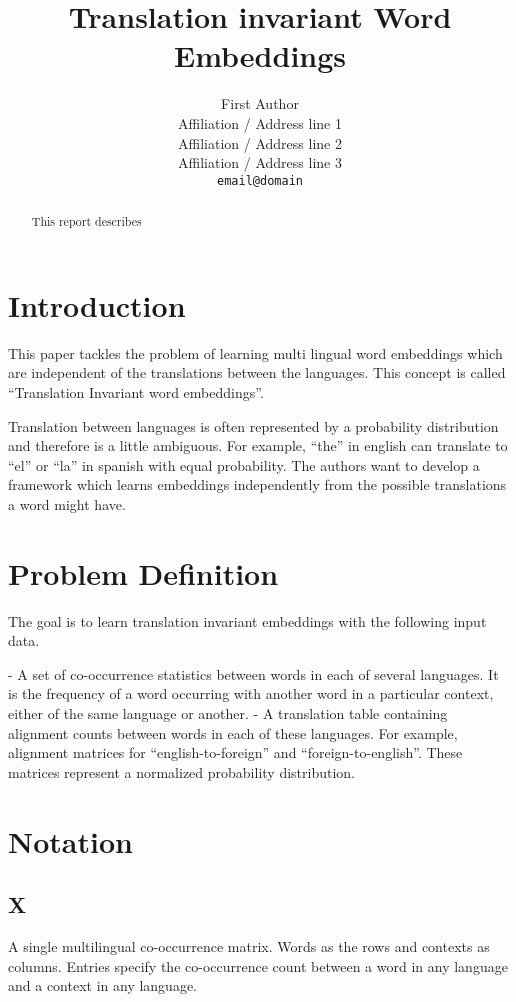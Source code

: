 \documentclass[11pt]{article}
\title{Translation invariant Word Embeddings}
\author{First Author \\
  Affiliation / Address line 1 \\
  Affiliation / Address line 2 \\
  Affiliation / Address line 3 \\
  {\tt email@domain}}
\date{}
\begin{document}
\maketitle
\begin{abstract}
This report describes \cite{huang2015translation}
\end{abstract}

\section{Introduction}
This paper tackles the problem of learning multi lingual word embeddings which are independent of the translations between the languages.  This concept is called “Translation Invariant word embeddings”.

Translation between languages is often represented by a probability distribution and therefore is a little ambiguous. For example, “the” in english can translate to “el” or “la” in spanish with equal probability. The authors want to develop a framework which learns embeddings independently from the possible translations a word might have.

\section{Problem Definition}
The goal is to learn translation invariant embeddings with the following input data.

- A set of co-occurrence statistics between words in each of several languages. It is the frequency of a word occurring with another word in a particular context, either of the same language or another. 
- A translation table containing alignment counts between words in each of these languages. For example, alignment matrices for “english-to-foreign” and “foreign-to-english”. These matrices represent a normalized probability distribution.

\section{Notation}

\subsection{X}
A single multilingual co-occurrence matrix.
Words as the rows and contexts as columns.
Entries specify the co-occurrence count between a word in any language and a context in any language.
\end{document}
